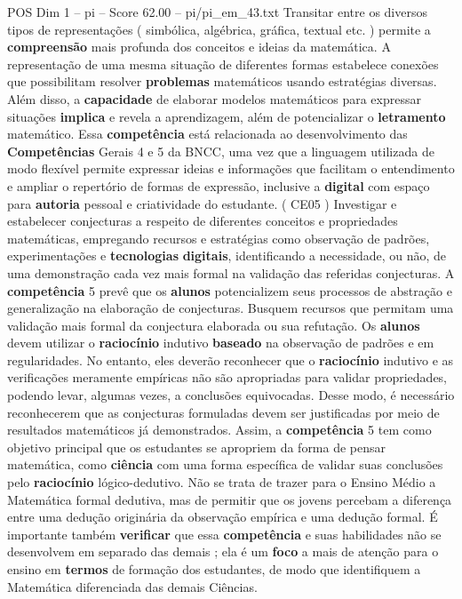 \begin{textsample}{POS Dim 1 – pi – Score 62.00 – pi/pi\_em\_43.txt}
Transitar entre os diversos tipos de representações ( simbólica, algébrica, gráfica, textual etc. ) permite a \textbf{compreensão} mais profunda dos conceitos e ideias da matemática.
A representação de uma mesma situação de diferentes formas estabelece conexões que possibilitam resolver \textbf{problemas} matemáticos usando estratégias diversas.
Além disso, a \textbf{capacidade} de elaborar modelos matemáticos para expressar situações \textbf{implica} e revela a aprendizagem, além de potencializar o \textbf{letramento} matemático.
Essa \textbf{competência} está relacionada ao desenvolvimento das \textbf{Competências} Gerais 4 e 5 da BNCC, uma vez que a linguagem utilizada de modo flexível permite expressar ideias e informações que facilitam o entendimento e ampliar o repertório de formas de expressão, inclusive a \textbf{digital} com espaço para \textbf{autoria} pessoal e criatividade do estudante. ( CE05 ) Investigar e estabelecer conjecturas a respeito de diferentes conceitos e propriedades matemáticas, empregando recursos e estratégias como observação de padrões, experimentações e \textbf{tecnologias} \textbf{digitais}, identificando a necessidade, ou não, de uma demonstração cada vez mais formal na validação das referidas conjecturas.
A \textbf{competência} 5 prevê que os \textbf{alunos} potencializem seus processos de abstração e generalização na elaboração de conjecturas.
Busquem recursos que permitam uma validação mais formal da conjectura elaborada ou sua refutação.
Os \textbf{alunos} devem utilizar o \textbf{raciocínio} indutivo \textbf{baseado} na observação de padrões e em regularidades.
No entanto, eles deverão reconhecer que o \textbf{raciocínio} indutivo e as verificações meramente empíricas não são apropriadas para validar propriedades, podendo levar, algumas vezes, a conclusões equivocadas.
Desse modo, é necessário reconhecerem que as conjecturas formuladas devem ser justificadas por meio de resultados matemáticos já demonstrados.
Assim, a \textbf{competência} 5 tem como objetivo principal que os estudantes se apropriem da forma de pensar matemática, como \textbf{ciência} com uma forma específica de validar suas conclusões pelo \textbf{raciocínio} lógico-dedutivo.
Não se trata de trazer para o Ensino Médio a Matemática formal dedutiva, mas de permitir que os jovens percebam a diferença entre uma dedução originária da observação empírica e uma dedução formal.
É importante também \textbf{verificar} que essa \textbf{competência} e suas habilidades não se desenvolvem em separado das demais ; ela é um \textbf{foco} a mais de atenção para o ensino em \textbf{termos} de formação dos estudantes, de modo que identifiquem a Matemática diferenciada das demais Ciências.

\end{textsample}
